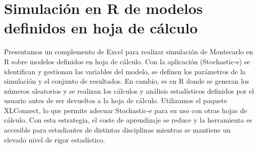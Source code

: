 \chapter{Simulación en R de modelos definidos en hoja de cálculo}




Presentamos un complemento de Excel para realizar simulación de Montecarlo en R sobre modelos definidos en hoja de cálculo. Con la aplicación (Stochastic-e) se identifican y gestionan las variables del modelo, se definen los parámetros de la simulación y el conjunto de resultados. En cambio, es en R donde se generan los números aleatorios y se realizan los cálculos y análisis estadísticos definidos por el usuario antes de ser devueltos a la hoja de cálculo. Utilizamos el paquete
XLConnect, lo que permite adecuar Stochastic-e para su uso con otras hojas de cálculo. Con esta estrategia, el coste de aprendizaje se reduce y la herramienta es accesible para estudiantes de distintas disciplinas mientras se mantiene un
elevado nivel de rigor estadístico.

%

%

